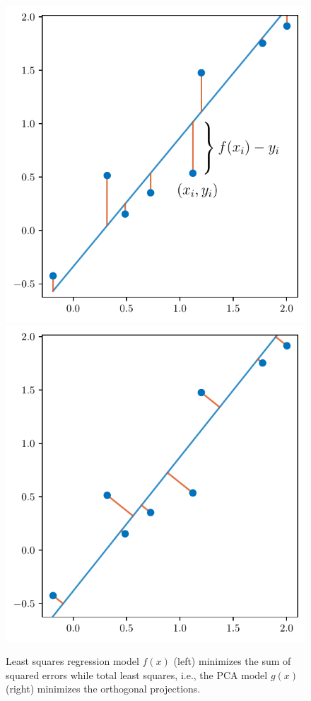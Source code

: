 \begin{example}
\begin{figure}
    \centering
    \includegraphics[width=.49\linewidth]{figs/fig-least-squares.pdf}
    \hfill
    \includegraphics[width=.49\linewidth]{figs/fig-pca-fit.pdf}
    \caption{Least squares regression model \(f(x)\) (left) minimizes the sum of squared errors while total least squares, i.e., the PCA model \(g(x)\) (right) minimizes the orthogonal projections.}
    \label{fig:ols-pca}
\end{figure}
\end{example}